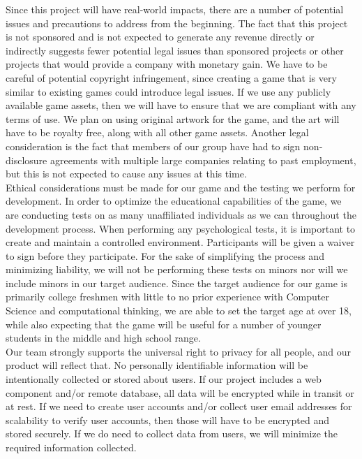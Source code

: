 Since this project will have real-world impacts, there are a number of
potential issues and precautions to address from the beginning. The fact that
this project is not sponsored and is not expected to generate any revenue
directly or indirectly suggests fewer potential legal issues than sponsored
projects or other projects that would provide a company with monetary gain. We have to
be careful of potential copyright infringement, since creating a game that is
very similar to existing games could introduce legal issues. If we use any
publicly available game assets, then we will have to ensure that we are
compliant with any terms of use. We plan on using original artwork for the game,
and the art will have to be royalty free, along with all other game assets.
Another legal consideration is the fact that members of our group have had to
sign non-disclosure agreements with multiple large companies relating to past
employment, but this is not expected to cause any issues at this time.\\

Ethical considerations must be made for our game and the testing we perform for
development. In order to optimize the educational capabilities of the game, we
are conducting tests on as many unaffiliated individuals as we can throughout
the development process. When performing any psychological tests, it is
important to create and maintain a controlled environment. Participants will be 
given a waiver to sign before they participate. For the sake of simplifying
the process and minimizing liability, we will not be performing these tests on
minors nor will we include minors in our target audience. Since the target
audience for our game is primarily college freshmen with little to no prior 
experience with Computer Science and computational thinking, we are able to 
set the target age at over 18, while also expecting that the game will be useful 
for a number of younger students in the middle and high school range.\\

Our team strongly supports the universal right to privacy for all people, and
our product will reflect that. No personally identifiable information will be
intentionally collected or stored about users. If our project includes a web
component and/or remote database, all data will be encrypted while in transit
or at rest. If we need to create user accounts and/or collect user email
addresses for scalability to verify user accounts, then those will have to be
encrypted and stored securely. If we do need to collect data from users, we 
will minimize the required information collected.\\